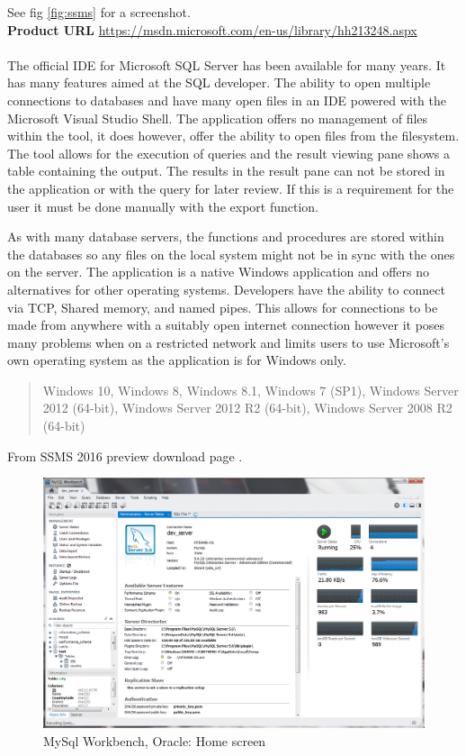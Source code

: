\noindent
See fig \ref{fig:ssms} for a screenshot.
\noindent\\
\textbf{Product URL}\cite{ssms}
\url{https://msdn.microsoft.com/en-us/library/hh213248.aspx}
\\
\\
\noindent
The official IDE for Microsoft SQL Server has been available for many years. 
It has many features aimed at the SQL developer. The ability
to open multiple connections to databases and have many open files in an IDE
powered with the Microsoft Visual Studio Shell\cite{vsshell}. The application
offers no management of files within the tool, it does however, offer the
ability to open files from the filesystem. The tool allows for the execution of
queries and the result viewing pane shows a table containing the output. The
results in the result pane can not be stored in the application or with the
query for later review. If this is a requirement for the user it must be done
manually with the export function.

As with many database servers, the functions and procedures are stored within the
databases so any files on the local system might not be in sync with the
ones on the server. The application is a native Windows application and offers
no alternatives for other operating systems. Developers have the ability to
connect via TCP, Shared memory, and named pipes. This allows for connections to
be made from anywhere with a suitably open internet connection however it poses
many problems when on a restricted network and limits users to use Microsoft's
own operating system as the application is for Windows only.

\blockquote{Windows 10, Windows 8, Windows 8.1, Windows 7 (SP1), Windows Server 2012 (64-bit), Windows Server 2012 R2 (64-bit), Windows Server 2008 R2 (64-bit)}

From SSMS 2016 preview download page \cite{ssmsdownload}.


\begin{figure}
  \includegraphics[width=\linewidth]{Figures/MySqlWorkbench.png}
  \caption{MySql Workbench, Oracle: Home screen}
  \label{fig:mysqlworkbench}
\end{figure}

